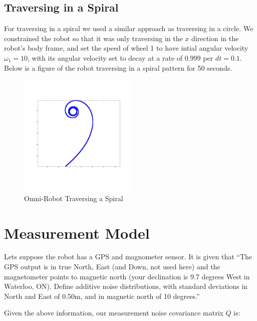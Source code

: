 \documentclass{article}
\begin{document}
\newpage
\subsection{Traversing in a Spiral}
\label{subsec:traverse_spiral}

For traversing in a spiral we used a similar approach as traversing in a 
circle. We constrained the robot so that it was only traversing in the $x$ 
direction in the robot's body frame, and set the speed of wheel 1 to have 
intial angular velocity $\omega_{1} = 10$, with its angular velocity set to 
decay at a rate of $0.999$ per $dt = 0.1$. Below is a figure of the robot 
traversing in a spiral pattern for 50 seconds.

\begin{figure}[H]
	\centering
	\includegraphics[width=0.5\textwidth]{images/traverse_spiral.jpg}
	\caption{Omni-Robot Traversing a Spiral}
	\label{fig:omni_robot_spiral}
\end{figure}






\newpage
\section{Measurement Model}
\label{sec:measurement_model}

Lets suppose the robot has a GPS and magnometer sensor. It is given that ``The
GPS output is in true North, East (and Down, not used here) and the
magnetometer points to magnetic north (your declination is 9.7 degrees West in
Waterloo, ON). Define additive noise distributions, with standard deviations in
North and East of 0.50m, and in magnetic north of 10 degrees.''

Given the above information, our measurement noise covariance matrix $Q$ is:
\end{document}
